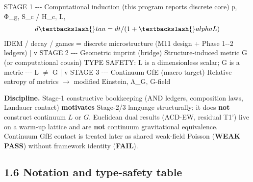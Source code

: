\documentclass[
  11pt,
]{article}
\newenvironment{Shaded}{}{}
\newcommand{\NormalTok}[1]{#1}
\begin{document}
\begin{Shaded}
\begin{Highlighting}[]
\NormalTok{STAGE 1 {-}{-}{-} Computational induction (this program report\textquotesingle{}s discrete core)}
\NormalTok{  ρ, Φ\_g, S\_c / H\_c, L, $$d\textbackslash{}tau=dt/(1+\textbackslash{}alpha L)$$}
\NormalTok{  IDEM / decay / games = discrete microstructure (M11 design + Phase 1{-}{-}2 ledgers)}
\NormalTok{        |}
\NormalTok{        v}
\NormalTok{STAGE 2 {-}{-}{-} Geometric imprint (bridge)}
\NormalTok{  Structure{-}induced metric G  (or computational cousin)}
\NormalTok{  TYPE SAFETY: L is a dimensionless scalar; G is a metric {-}{-}{-} L $\neq$ G}
\NormalTok{        |}
\NormalTok{        v}
\NormalTok{STAGE 3 {-}{-}{-} Continuum GfE (macro target)}
\NormalTok{  Relative entropy of metrics $\to$ modified Einstein, Λ\_G, G{-}field}
\end{Highlighting}
\end{Shaded}

\textbf{Discipline.} Stage-1 constructive bookkeeping (AND ledgers,
composition laws, Landauer contact) \textbf{motivates} Stage-2/3
language structurally; it does \textbf{not} construct continuum \(L\) or
\(G\). Euclidean dual results (ACD-EW, residual T1') live on a warm-up
lattice and are \textbf{not} continuum gravitational equivalence.
Continuum GfE contact is treated later as shared weak-field Poisson
(\textbf{WEAK PASS}) without framework identity (\textbf{FAIL}).

\subsection{1.6 Notation and type-safety
table}\label{notation-and-type-safety-table}
\end{document}

